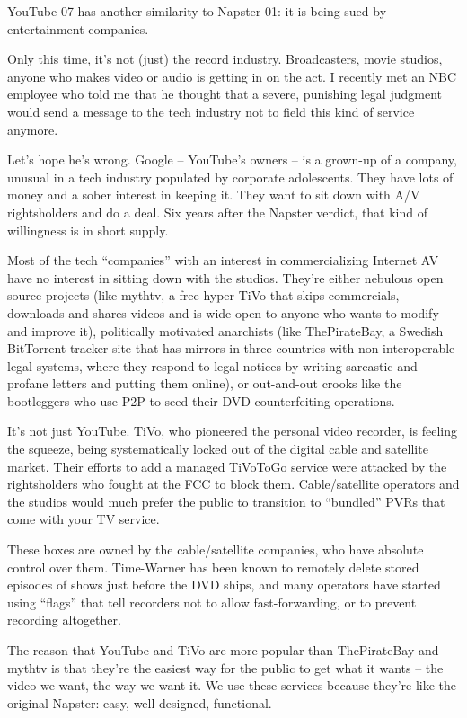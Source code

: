 YouTube 07 has another similarity to Napster 01: it is being sued
by entertainment companies.

Only this time, it's not (just) the record industry. Broadcasters,
movie studios, anyone who makes video or audio is getting in on the
act. I recently met an NBC employee who told me that he thought
that a severe, punishing legal judgment would send a message to the
tech industry not to field this kind of service anymore.

Let's hope he's wrong. Google -- YouTube's owners -- is a grown-up
of a company, unusual in a tech industry populated by corporate
adolescents. They have lots of money and a sober interest in
keeping it. They want to sit down with A/V rightsholders and do a
deal. Six years after the Napster verdict, that kind of willingness
is in short supply.

Most of the tech ``companies'' with an interest in commercializing
Internet AV have no interest in sitting down with the studios.
They're either nebulous open source projects (like mythtv, a free
hyper-TiVo that skips commercials, downloads and shares videos and
is wide open to anyone who wants to modify and improve it),
politically motivated anarchists (like ThePirateBay, a Swedish
BitTorrent tracker site that has mirrors in three countries with
non-interoperable legal systems, where they respond to legal
notices by writing sarcastic and profane letters and putting them
online), or out-and-out crooks like the bootleggers who use P2P to
seed their DVD counterfeiting operations.

It's not just YouTube. TiVo, who pioneered the personal video
recorder, is feeling the squeeze, being systematically locked out
of the digital cable and satellite market. Their efforts to add a
managed TiVoToGo service were attacked by the rightsholders who
fought at the FCC to block them. Cable/satellite operators and the
studios would much prefer the public to transition to ``bundled''
PVRs that come with your TV service.

These boxes are owned by the cable/satellite companies, who have
absolute control over them. Time-Warner has been known to remotely
delete stored episodes of shows just before the DVD ships, and many
operators have started using ``flags'' that tell recorders not to
allow fast-forwarding, or to prevent recording altogether.

The reason that YouTube and TiVo are more popular than ThePirateBay
and mythtv is that they're the easiest way for the public to get
what it wants -- the video we want, the way we want it. We use
these services because they're like the original Napster: easy,
well-designed, functional.

